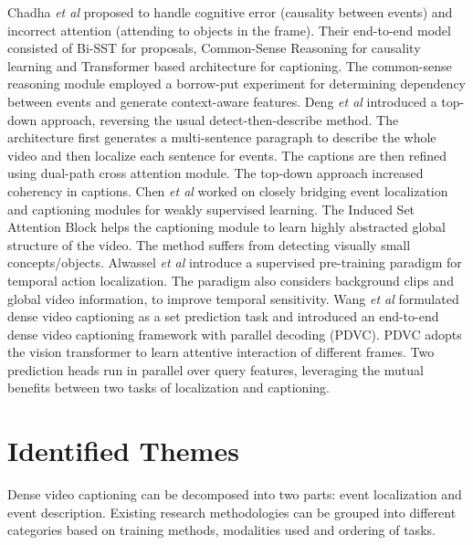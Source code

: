 \par Chadha \textit{et al} \cite{chadha2020iperceive} proposed to handle cognitive error (causality between events) and incorrect attention (attending to objects in the frame). Their end-to-end model consisted of Bi-SST for proposals, Common-Sense Reasoning for causality learning and Transformer based architecture \cite{iashin2020multimodal} for captioning. The common-sense reasoning module employed a borrow-put experiment for determining dependency between events and generate context-aware features. Deng \textit{et al} \cite{deng2021sketch} introduced a top-down approach, reversing the usual detect-then-describe method. The architecture first generates a multi-sentence paragraph to describe the whole video and then localize each sentence for events. The captions are then refined using dual-path cross attention module. The top-down approach increased coherency in captions. Chen \textit{et al} \cite{chen2021towards} worked on closely bridging event localization and captioning modules for weakly supervised learning. The Induced Set Attention Block helps the captioning module to learn highly abstracted global structure of the video. The method suffers from detecting visually small concepts/objects. Alwassel \textit{et al} \cite{alwassel2021tsp} introduce a supervised pre-training  paradigm for temporal action localization. The paradigm also considers background clips and global video information, to improve temporal sensitivity. Wang \textit{et al} \cite{wang2021endtoend} formulated dense video captioning as a set prediction task and introduced an end-to-end dense video captioning framework with parallel decoding (PDVC). PDVC adopts the vision transformer to learn attentive interaction of different frames. Two prediction heads run in parallel over query features, leveraging the mutual benefits between two tasks of localization and captioning.

\section{Identified Themes}
\par Dense video captioning can be decomposed into two parts: event localization and event description. Existing research methodologies can be grouped into different categories based on training methods, modalities used and ordering of tasks.

